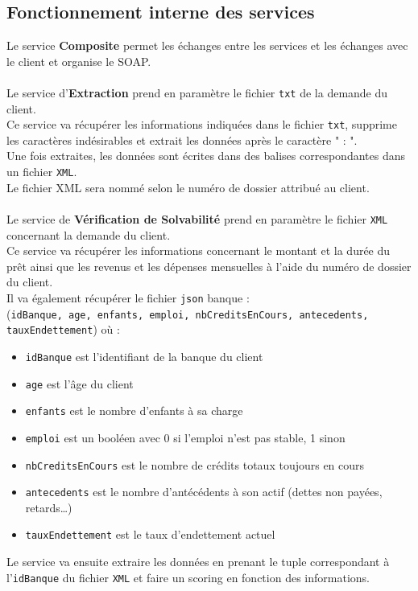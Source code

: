 \documentclass{article}
\begin{document}
	\newpage
	\subsection{Fonctionnement interne des services}
	Le service \textbf{Composite} permet les échanges entre les services et les échanges avec le client et organise le SOAP. \\
	\\
	Le service d’\textbf{Extraction} prend en paramètre le fichier \texttt{txt} de la demande du client.\\
	Ce service va récupérer les informations indiquées dans le fichier \texttt{txt}, supprime les caractères indésirables et extrait les données après le caractère " : ".\\
	Une fois extraites, les données sont écrites dans des balises correspondantes dans un fichier \texttt{XML}. \\
	Le fichier XML sera nommé selon le numéro de dossier attribué au client. \\
	\\
	Le service de \textbf{Vérification de Solvabilité} prend en paramètre le fichier \texttt{XML} concernant la demande du client. \\
	Ce service va récupérer les informations concernant le montant et la durée du prêt ainsi que les revenus et les dépenses mensuelles à l'aide du numéro de dossier du client. \\
	Il va également récupérer le fichier \texttt{json} banque : \\
	(\texttt{idBanque, age, enfants, emploi, nbCreditsEnCours, antecedents, tauxEndettement}) où : 
	\begin{itemize}
		\item \texttt{idBanque} est l’identifiant de la banque du client
		\item \texttt{age} est l’âge du client
		\item \texttt{enfants} est le nombre d’enfants à sa charge
		\item \texttt{emploi} est un booléen avec 0 si l’emploi n’est pas stable, 1 sinon
		\item \texttt{nbCreditsEnCours} est le nombre de crédits totaux toujours en cours
		\item \texttt{antecedents} est le nombre d’antécédents à son actif (dettes non payées, retards…) 
		\item \texttt{tauxEndettement} est le taux d’endettement actuel
	\end{itemize}
	Le service va ensuite extraire les données en prenant le tuple correspondant à l’\texttt{idBanque} du fichier \texttt{XML} et faire un scoring en fonction des informations. \\
\end{document}

